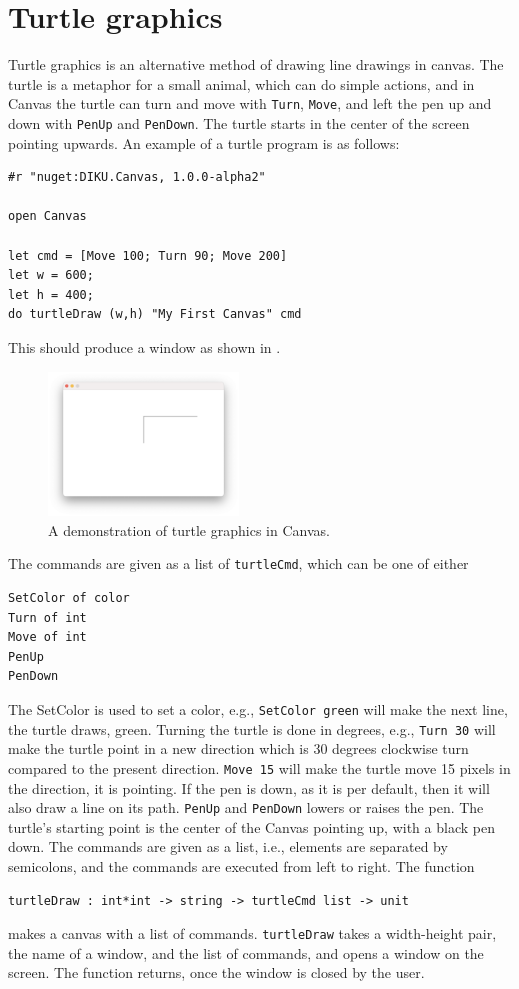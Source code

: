 \documentclass{article}
\begin{document}
\section{Turtle graphics}
Turtle graphics is an alternative method of drawing line drawings in canvas. The turtle is a metaphor for a small animal, which can do simple actions, and in Canvas the turtle can turn and move with \lstinline{Turn}, \lstinline{Move}, and left the pen up and down with \lstinline{PenUp} and \lstinline{PenDown}. The turtle starts in the center of the screen pointing upwards. An example of a turtle program is as follows:
\begin{lstlisting}
#r "nuget:DIKU.Canvas, 1.0.0-alpha2"

open Canvas

let cmd = [Move 100; Turn 90; Move 200]
let w = 600;
let h = 400;
do turtleDraw (w,h) "My First Canvas" cmd
\end{lstlisting}
This should produce a window as shown in .
\begin{figure}
  \centering
  \includegraphics[width=0.45\textwidth]{myFirstTurtle}
  \caption{A demonstration of turtle graphics in Canvas.}
  \label{fig:myFirstTurtle}
\end{figure}
The commands are given as a list of \lstinline{turtleCmd}, which can be one of either
\begin{lstlisting}
SetColor of color
Turn of int
Move of int
PenUp
PenDown
\end{lstlisting}
The SetColor is used to set a color, e.g., \lstinline{SetColor green} will make the next line, the turtle draws, green. Turning the turtle is done in degrees, e.g., \lstinline{Turn 30} will make the turtle point in a new direction which is 30 degrees clockwise turn compared to the present direction.  \lstinline{Move 15} will make the turtle move 15 pixels in the direction, it is pointing. If the pen is down, as it is per default, then it will also draw a line on its path. \lstinline{PenUp} and \lstinline{PenDown} lowers or raises the pen. The turtle's starting point is the center of the Canvas pointing up, with a black pen down. The commands are given as a list, i.e.,  elements are separated by semicolons, and the commands are executed from left to right. The function
\begin{lstlisting}
turtleDraw : int*int -> string -> turtleCmd list -> unit
\end{lstlisting}
makes a canvas with a list of commands. \lstinline{turtleDraw} takes a width-height pair, the name of a window, and the list of commands, and opens a window on the screen. The function returns, once the window is closed by the user. 
\end{document}
